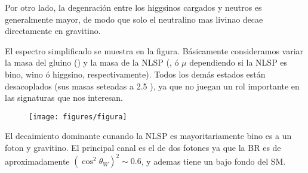 Por otro lado, la degenraci\'on entre los higgsinos cargados y neutros es generalmente mayor, de modo
que solo el neutralino mas livinao decae directamente en gravitino.

El espectro simplificado se muestra en la figura. Básicamente consideramos variar
la masa del gluino () y la masa de la NLSP (,  ó $\mu$ dependiendo
si la NLSP es bino, wino ó higgsino, respectivamente). Todos los demás estados
están desacoplados (sus masas seteadas a 2.5 \tev), ya que no juegan un rol importante
en las signaturas que nos interesan.

\begin{figure}[h]
  \centering
  \texttt{[image: figures/figura]}
\end{figure}




El decaimiento dominante cunando la NLSP es mayoritariamente bino es a un foton y gravitino.
El principal canal es el de dos fotones ya que la BR es de aproximadamente $(\cos^2\theta_W)^2 \sim 0.6$,
y ademas tiene un bajo fondo del SM.



